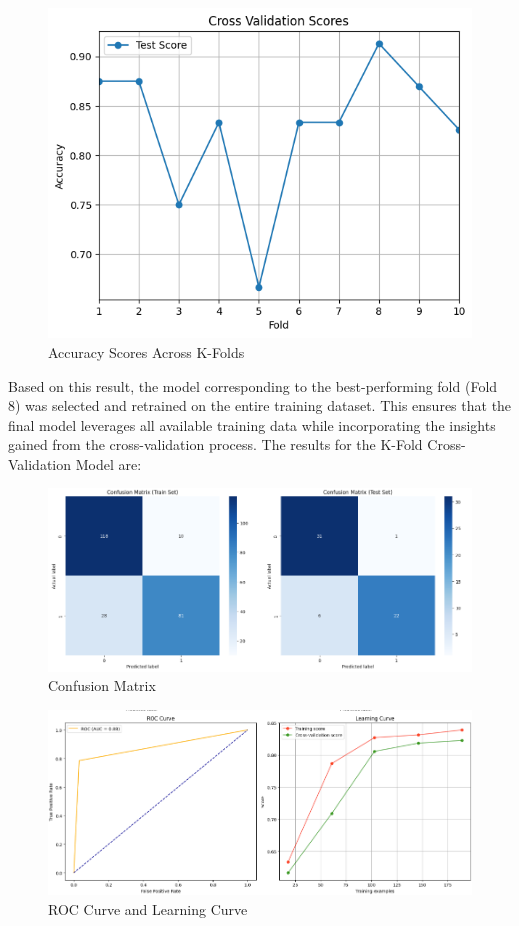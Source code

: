 \begin{figure}[H] \centering \includegraphics[width=0.75\linewidth]{images/k_fold_cross_log_reg.png} \caption{Accuracy Scores Across K-Folds} \label{fig:kfold_logReg} \end{figure}

Based on this result, the model corresponding to the best-performing fold (Fold 8) was selected and retrained on the entire training dataset. This ensures that the final model leverages all available training data while incorporating the insights gained from the cross-validation process.
The results for the K-Fold Cross-Validation Model are:

\begin{figure}[H]
    \centering
    \includegraphics[width=1\linewidth]{images/confusion_matrix_lg_reg_kfold.png}
    \caption{Confusion Matrix}
    \label{fig:enter-label}
\end{figure}
\begin{figure}[H]
    \centering
    \includegraphics[width=1\linewidth]{images/roc_learning_logreg_kfold.png}
    \caption{ROC Curve and Learning Curve}%
    \label{fig:enter-label}
\end{figure}

